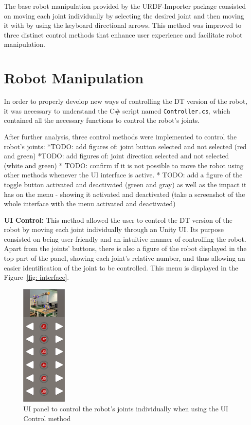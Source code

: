 The base robot manipulation provided by the \ac{URDF}-Importer package consisted on moving each joint individually by selecting the desired joint and then moving it with by using the keyboard directional arrows. This method was improved to three distinct control methods that enhance user experience and facilitate robot manipulation.

\section{Robot Manipulation}
In order to properly develop new ways of controlling the \ac{DT} version of the robot, it was necessary to understand the C\# script named \texttt{Controller.cs}, which contained all the necessary functions to control the robot's joints.


After further analysis, three control methods were implemented to control the robot's joints:
    *TODO: add figures of: joint button selected and not selected (red and green)
    *TODO: add figures of: joint direction selected and not selected (white and green)
    * TODO: confirm if it is not possible to move the robot using other methods whenever the \ac{UI} interface is active. 
    * TODO: add a figure of the toggle button activated and deactivated (green and gray) as well as the impact it has on the menu - showing it activated and deactivated (take a screenshot of the whole interface with the menu activated and deactivated)

    \textbf{UI Control:} This method allowed the user to control the \ac{DT} version of the robot by moving each joint individually through an Unity \ac{UI}. Its purpose consisted on being user-friendly and an intuitive manner of controlling the robot. Apart from the joints' buttons, there is also a figure of the robot displayed in the top part of the panel, showing each joint's relative number, and thus allowing an easier identification of the joint to be controlled. This menu is displayed in the Figure~\ref{fig: interface}.
    
    \begin{figure}[h]
        \centering
        \includegraphics[width=0.2\textwidth]{figs/toggle-1.png}
        \caption{\ac{UI} panel to control the robot's joints individually when using the \ac{UI} Control method}
        \label{f:ui-control}
    \end{figure}

